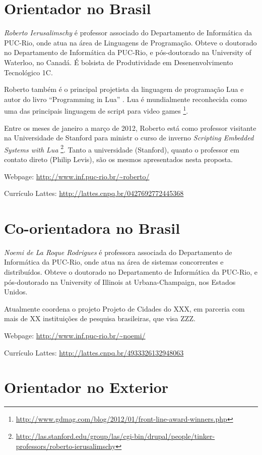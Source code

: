 \documentclass[11pt,a4paper]{report}
\begin{document}
\section{Orientador no Brasil}

\emph{Roberto Ierusalimschy} é professor associado do Departamento de 
Informática da PUC-Rio, onde atua na área de Linguagens de Programação.
Obteve o doutorado no Departamento de Informática da PUC-Rio, e pós-doutorado 
na University of Waterloo, no Canadá.
É bolsista de Produtividade em Desenenvolvimento Tecnológico 1C.

Roberto também é o principal projetista da linguagem de programação Lua e autor 
do livro ``Programming in Lua'' \cite{}.
Lua é mundialmente reconhecida como uma das principais linguagem de script para 
video games%
\footnote{\url{http://www.gdmag.com/blog/2012/01/front-line-award-winners.php}}.

Entre os meses de janeiro a março de 2012, Roberto está como professor 
visitante na Universidade de Stanford para ministr o curso de inverno 
\emph{Scripting Embedded Systems with Lua}%
\footnote{\url{http://las.stanford.edu/group/las/cgi-bin/drupal/people/tinker-professors/roberto-ierusalimschy}}.
Tanto a universidade (Stanford), quanto o professor em contato direto (Philip 
Levis), são os mesmos apresentados nesta proposta.

Webpage: \url{http://www.inf.puc-rio.br/~roberto/}

Currículo Lattes: \url{http://lattes.cnpq.br/0427692772445368}

\section{Co-orientadora no Brasil}

\emph{Noemi de La Roque Rodrigues} é professora associada do Departamento de 
Informática da PUC-Rio, onde atua na área de sistemas concorrentes e 
distribuídos.
Obteve o doutorado no Departamento de Informática da PUC-Rio, e pós-doutorado 
na University of Illinois at Urbana-Champaign, nos Estados Unidos.

Atualmente coordena o projeto Projeto de Cidades do XXX, em parceria com mais 
de XX instituições de pesquisa brasileiras, que visa ZZZ.

Webpage: \url{http://www.inf.puc-rio.br/~noemi/}

Currículo Lattes: \url{http://lattes.cnpq.br/4933326132948063}

\section{Orientador no Exterior}
\end{document}
